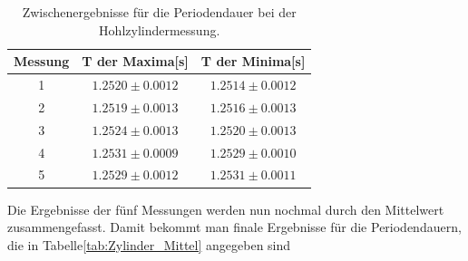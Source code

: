 \documentclass[12pt,a4paper]{article}
\begin{document}
\begin{table}[H]
\caption{Zwischenergebnisse für die Periodendauer bei der Hohlzylindermessung.}
\begin{center}
\begin{tabular}{|c|c|c|}
\hline
Messung & T der Maxima[s] & T der Minima[s]  \\
\hline
1  & $ 1.2520 \pm  0.0012 $ & $ 1.2514 \pm  0.0012 $ \\
\hline
2  & $ 1.2519 \pm  0.0013 $ & $ 1.2516 \pm  0.0013 $ \\
\hline
3  & $ 1.2524 \pm  0.0013 $ & $ 1.2520 \pm  0.0013 $ \\
\hline
4  & $ 1.2531 \pm  0.0009 $ & $ 1.2529 \pm  0.0010 $ \\
\hline
5  & $ 1.2529 \pm  0.0012 $ & $ 1.2531 \pm  0.0011 $ \\
\hline
\end{tabular}
\end{center}
\label{tab:Hohl_Ergebnisse}
\end{table}

Die Ergebnisse der fünf Messungen werden nun nochmal durch den Mittelwert zusammengefasst.
Damit bekommt man finale Ergebnisse für die Periodendauern, die in Tabelle\ref{tab:Zylinder_Mittel} angegeben sind
\end{document}
